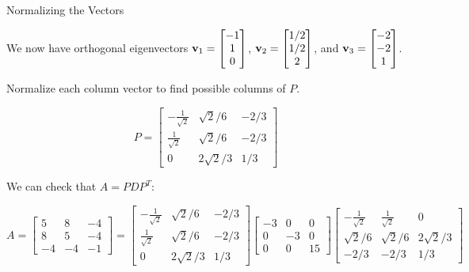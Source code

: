 \documentclass[xcolor=dvipsnames,aspectratio=169,t]{beamer}
\begin{document}
\begin{frame}{Normalizing the Vectors}
  \smallskip

  We now have orthogonal eigenvectors 
  $\mathbf{v}_1 = \begin{bmatrix} -1 \\ 1 \\ 0 \end{bmatrix}$,
  $\mathbf{v}_2 = \begin{bmatrix} 1/2 \\ 1/2 \\ 2 \end{bmatrix}$, and 
  $\mathbf{v}_3 =  \begin{bmatrix} -2 \\ -2 \\ 1 \end{bmatrix}$.
  \bigskip

  \pause
  \bb
  \addtocounter{enumi}{3}
  \ii Normalize each column vector to find possible columns of $P$.

  \[ P = \begin{bmatrix} -\frac{1}{\sqrt{2}} & \sqrt{2}/6 & -2/3 \\
  \frac{1}{\sqrt{2}} & \sqrt{2}/6 & -2/3\\
  0 & 2\sqrt{2}/3 & 1/3 \end{bmatrix} \]
  \ee


  We can check that $A=PDP^T$:

  \[ A = \begin{bmatrix} 5 & 8 & -4 \\ 8 & 5 & -4 \\ -4 & -4 & -1 \end{bmatrix} =  
  \begin{bmatrix} -\frac{1}{\sqrt{2}} & \sqrt{2}/6 & -2/3 \\ \frac{1}{\sqrt{2}} & \sqrt{2}/6 & -2/3 \\ 0 & 2\sqrt{2}/3 & 1/3 \end{bmatrix} 
  \begin{bmatrix} -3 & 0 & 0 \\ 0 & -3 & 0 \\ 0 & 0 & 15 \end{bmatrix}
  \begin{bmatrix}  -\frac{1}{\sqrt{2}} & \frac{1}{\sqrt{2}} & 0 \\ \sqrt{2}/6 & \sqrt{2}/6  & 2\sqrt{2}/3 \\ -2/3 & -2/3 & 1/3 \end{bmatrix} \]

\end{frame}
\end{document}
